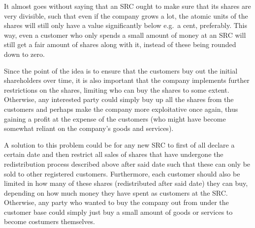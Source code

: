 \documentclass{article}
\begin{document}
It almost goes without saying that an SRC ought to make sure that its shares are very divisible, such that even if the company grows a lot, the atomic units of the shares will still only have a value significantly below e.g.\ a cent, preferably. 
This way, even a customer who only spends a small amount of money at an SRC will still get a fair amount of shares along with it, instead of these being rounded down to zero.




Since the point of the idea is to ensure that the customers buy out the initial shareholders over time, it is also important that the company implements further restrictions on the shares, limiting who can buy the shares to some extent. Otherwise, any interested party could simply buy up all the shares from the customers and perhaps make the company more exploitative once again, thus gaining a profit at the expense of the customers (who might have become somewhat reliant on the company's goods and services). 

A solution to this problem could be for any new SRC to first of all declare a certain date and then restrict all sales of shares that have undergone the redistribution process described above after said date such that these can only be sold to other registered customers. 
Furthermore, each customer should also be limited in how many of these shares (redistributed after said date) they can buy, depending on how much money they have spent as customers at the SRC. 
Otherwise, any party who wanted to buy the company out from under the customer base could simply just buy a small amount of goods or services to become costumers themselves.
 
\end{document}
